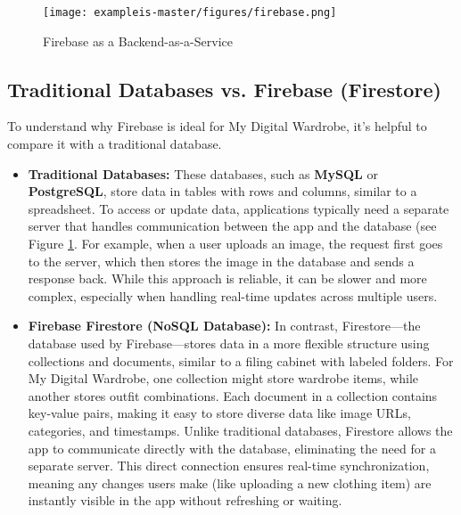 \begin{figure}[h]
    \centering
    \texttt{[image: exampleis-master/figures/firebase.png]}
    \caption{Firebase as a Backend-as-a-Service\cite{firebase_intro}}
    \label{fig:firebase_backend}
\end{figure}

\subsection{Traditional Databases vs. Firebase (Firestore)}

To understand why Firebase is ideal for My Digital Wardrobe, it’s helpful to compare it with a traditional database.
\begin{itemize}
    \item \textbf{Traditional Databases:}
These databases, such as\textbf{ MySQL} or \textbf{PostgreSQL}, store data in tables with rows and columns, similar to a spreadsheet. To access or update data, applications typically need a separate server that handles communication between the app and the database (see Figure \ref{fig:firebase_backend}. For example, when a user uploads an image, the request first goes to the server, which then stores the image in the database and sends a response back. While this approach is reliable, it can be slower and more complex, especially when handling real-time updates across multiple users.

\item \textbf{Firebase Firestore (NoSQL Database):}
In contrast, Firestore—the database used by Firebase—stores data in a more flexible structure using collections and documents, similar to a filing cabinet with labeled folders. For My Digital Wardrobe, one collection might store wardrobe items, while another stores outfit combinations. Each document in a collection contains key-value pairs, making it easy to store diverse data like image URLs, categories, and timestamps.
Unlike traditional databases, Firestore allows the app to communicate directly with the database, eliminating the need for a separate server. This direct connection ensures real-time synchronization, meaning any changes users make (like uploading a new clothing item) are instantly visible in the app without refreshing or waiting.
\end{itemize}
